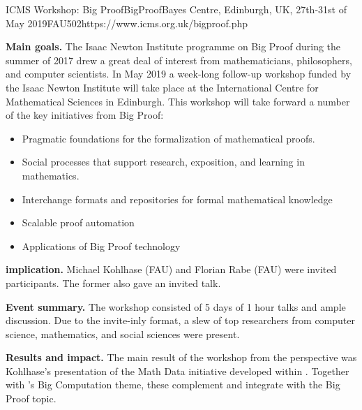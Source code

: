 \begin{event}{ICMS Workshop: Big Proof}{BigProof}{Bayes Centre, Edinburgh, UK, 27th-31st of May 2019}{FAU}{50}{2}{https://www.icms.org.uk/bigproof.php}

\textbf{Main goals.}
The Isaac Newton Institute programme on Big Proof during the summer of 2017 drew a great deal of interest from mathematicians, philosophers, and computer scientists.  In May 2019 a week-long follow-up workshop funded by the Isaac Newton Institute will take place at the International Centre for Mathematical Sciences in Edinburgh. This workshop will take forward a number of the key initiatives from Big Proof:

\begin{itemize}
\item Pragmatic foundations for the formalization of mathematical proofs.
\item Social processes that support research, exposition, and learning in mathematics.
\item Interchange formats and repositories for formal mathematical knowledge
\item Scalable proof automation
\item Applications of Big Proof technology
\end{itemize}

\textbf{\ODK implication.}
Michael Kohlhase (FAU) and Florian Rabe (FAU) were invited participants. The former also gave an invited talk.

\textbf{Event summary.}
The workshop consisted of 5 days of 1 hour talks and ample discussion.
Due to the invite-inly format, a slew of top researchers from computer science, mathematics, and social sciences were present.

\textbf{Results and impact.}
The main result of the workshop from the \ODK perspective was Kohlhase's presentation of the Math Data initiative developed within \ODK.
Together with \ODK's Big Computation theme, these complement and integrate with the Big Proof topic.
\end{event}
